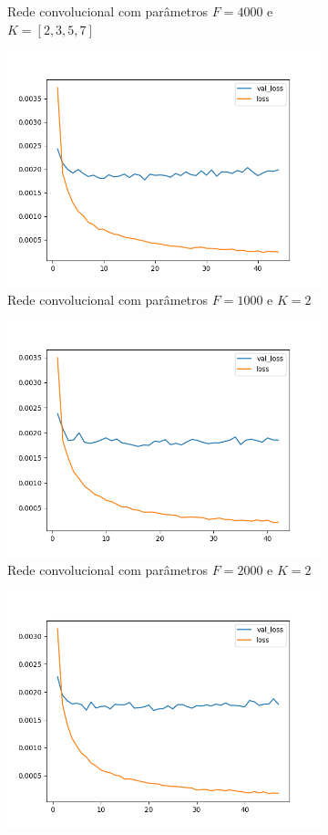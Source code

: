 \begin{figure}[H]
\begin{subfigure}{.5\textwidth}
  \caption{Rede convolucional com parâmetros $F = 4000$ e $K = [2, 3, 5, 7]$}
  \label{fig:cnn-4000}
\end{subfigure}
\begin{subfigure}{.5\textwidth}
  \centering
  \includegraphics[width=.8\linewidth]{figuras/ape-ajustes-hiper-parametros/cnn-1000-k-2.png}
  \caption{Rede convolucional com parâmetros $F = 1000$ e $K = 2$}
  \label{fig:cnn-1000-k-2-v2}
\end{subfigure}
\begin{subfigure}{.5\textwidth}
  \centering
  \includegraphics[width=.8\linewidth]{figuras/ape-ajustes-hiper-parametros/cnn-2000-k-2.png}
  \caption{Rede convolucional com parâmetros $F = 2000$ e $K = 2$}
  \label{fig:cnn-2000-k-2-v2}
\end{subfigure}
\begin{subfigure}{.5\textwidth}
  \centering
  \includegraphics[width=.8\linewidth]{figuras/ape-ajustes-hiper-parametros/cnn-4000-k-2.png}

\end{subfigure}
\end{figure}
